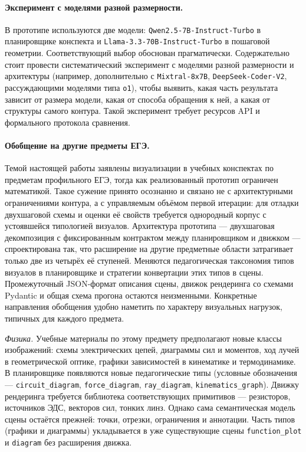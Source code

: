 \paragraph{Эксперимент с моделями разной размерности.} В прототипе используются две модели: \texttt{Qwen2.5-7B-Instruct-Turbo} в планировщике конспекта и \texttt{Llama-3.3-70B-Instruct-Turbo} в пошаговой геометрии. Соответствующий выбор обоснован прагматически. Содержательно стоит провести систематический эксперимент с моделями разной размерности и архитектуры (например, дополнительно с \texttt{Mixtral-8x7B}, \texttt{DeepSeek-Coder-V2}, рассуждающими моделями типа \texttt{o1}), чтобы выявить, какая часть результата зависит от размера модели, какая от способа обращения к ней, а какая от структуры самого контура. Такой эксперимент требует ресурсов API и формального протокола сравнения.

\paragraph{Обобщение на другие предметы ЕГЭ.} Темой настоящей работы заявлены визуализации в учебных конспектах по предметам профильного ЕГЭ, тогда как реализованный прототип ограничен математикой. Такое сужение принято осознанно и связано не с архитектурными ограничениями контура, а с управляемым объёмом первой итерации: для отладки двухшаговой схемы и оценки её свойств требуется однородный корпус с устоявшейся типологией визуалов. Архитектура прототипа --- двухшаговая декомпозиция с фиксированным контрактом между планировщиком и движком --- спроектирована так, что расширение на другие предметные области затрагивает только две из четырёх её ступеней. Меняются педагогическая таксономия типов визуалов в планировщике и стратегии конвертации этих типов в сцены. Промежуточный JSON\nobreakdash-формат описания сцены, движок рендеринга со схемами Pydantic и общая схема прогона остаются неизменными. Конкретные направления обобщения удобно наметить по характеру визуальных нагрузок, типичных для каждого предмета.

\textit{Физика.} Учебные материалы по этому предмету предполагают новые классы изображений: схемы электрических цепей, диаграммы сил и моментов, ход лучей в геометрической оптике, графики зависимостей в кинематике и термодинамике. В планировщике появляются новые педагогические типы (условные обозначения --- \texttt{circuit\_diagram}, \texttt{force\_diagram}, \texttt{ray\_diagram}, \texttt{kinematics\_graph}). Движку рендеринга требуется библиотека соответствующих примитивов --- резисторов, источников ЭДС, векторов сил, тонких линз. Однако сама семантическая модель сцены остаётся прежней: точки, отрезки, ограничения и аннотации. Часть типов (графики и диаграммы) укладывается в уже существующие сцены \texttt{function\_plot} и \texttt{diagram} без расширения движка.

